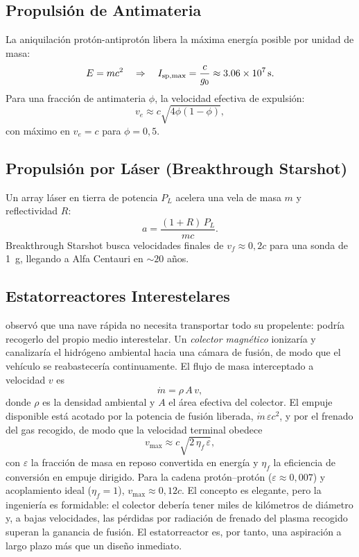 \documentclass[12pt,a4paper]{article}
\begin{document}
\subsection{Propulsión de Antimateria}

La aniquilación protón-antiprotón libera la máxima energía posible por
unidad de masa:
\begin{equation}
  E = mc^2 \quad \Rightarrow \quad
  I_{\mathrm{sp,max}} = \frac{c}{g_0} \approx \SI{3{,}06e7}{\second}.
\end{equation}
Para una fracción de antimateria $\phi$, la velocidad efectiva de expulsión:
\begin{equation}
  v_e \approx c\sqrt{4\phi(1-\phi)},
\end{equation}
con máximo en $v_e = c$ para $\phi = 0{,}5$.

\subsection{Propulsión por Láser (Breakthrough Starshot)}

Un array láser en tierra de potencia $P_L$ acelera una vela de masa $m$ y
reflectividad $R$:
\begin{equation}
  a = \frac{(1+R)\,P_L}{mc}.
\end{equation}
Breakthrough Starshot busca velocidades finales de $v_f \approx 0{,}2c$ para
una sonda de \SI{1}{\gram}, llegando a Alfa Centauri en $\sim 20$ años.

\subsection{Estatorreactores Interestelares}

\citet{Bussard1960} observó que una nave rápida no necesita transportar todo su
propelente: podría recogerlo del propio medio interestelar. Un
\emph{colector magnético} ionizaría y canalizaría el hidrógeno ambiental hacia
una cámara de fusión, de modo que el vehículo se reabastecería continuamente.
El flujo de masa interceptado a velocidad $v$ es
\begin{equation}
  \dot m = \rho\,A\,v,
  \label{eq:ram_flux_es}
\end{equation}
donde $\rho$ es la densidad ambiental y $A$ el área efectiva del colector. El
empuje disponible está acotado por la potencia de fusión liberada,
$\dot m\,\varepsilon c^2$, y por el frenado del gas recogido, de modo que la
velocidad terminal obedece
\begin{equation}
  v_{\max} \approx c\sqrt{2\,\eta_f\,\varepsilon},
  \label{eq:ram_vmax_es}
\end{equation}
con $\varepsilon$ la fracción de masa en reposo convertida en energía y
$\eta_f$ la eficiencia de conversión en empuje dirigido. Para la cadena
protón--protón ($\varepsilon \approx 0{,}007$) y acoplamiento ideal
($\eta_f = 1$), $v_{\max} \approx 0{,}12c$. El concepto es elegante, pero la
ingeniería es formidable: el colector debería tener miles de kilómetros de
diámetro y, a bajas velocidades, las pérdidas por radiación de frenado del
plasma recogido superan la ganancia de fusión. El estatorreactor es, por
tanto, una aspiración a largo plazo más que un diseño inmediato.
\end{document}

